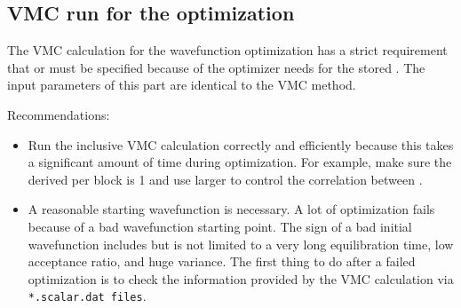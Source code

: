 \subsection{VMC run for the optimization}
The VMC calculation for the wavefunction optimization has a strict requirement 
that  or  must be specified because of the optimizer needs for the stored .
The input parameters of this part are identical to the VMC method.

Recommendations:
\begin{itemize}
\item Run the inclusive VMC calculation correctly and efficiently because this takes a significant amount of time during optimization.
For example, make sure the derived  per block is 1 and use larger  to control the correlation between .
\item A reasonable starting wavefunction is necessary. A lot of optimization fails because of a bad wavefunction starting point.
The sign of a bad initial wavefunction includes but is not limited to a very long equilibration time, low acceptance ratio, and huge variance.
The first thing to do after a failed optimization is to check the information provided by the VMC calculation via \texttt{*.scalar.dat files}.
\end{itemize}


